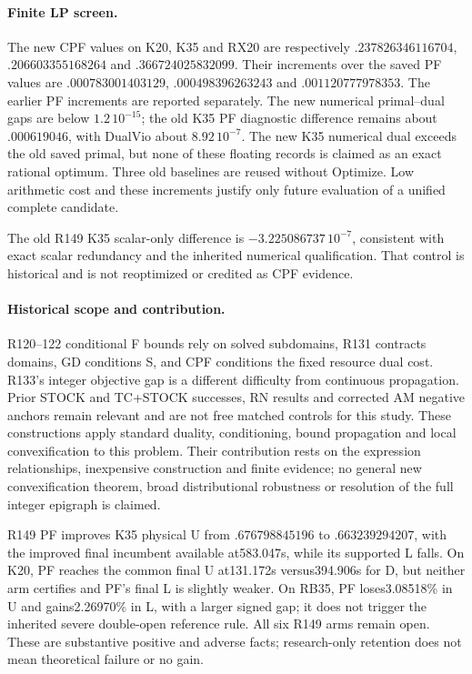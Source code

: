 \paragraph{Finite LP screen.}
The new CPF values on K20, K35 and RX20 are respectively
$.237826346116704$, $.206603355168264$ and $.366724025832099$.
Their increments over the saved PF values are $.000783001403129$,
$.000498396263243$ and $.001120777978353$. The earlier PF increments are
reported separately. The new numerical primal--dual gaps are below
$1.2\,10^{-15}$; the old K35 PF diagnostic difference remains about
$.000619046$, with DualVio about $8.92\,10^{-7}$. The new K35 numerical
dual exceeds the old saved primal, but none of these floating records is
claimed as an exact rational optimum. Three old baselines are reused without
Optimize. Low arithmetic cost and these increments justify only future
evaluation of a unified complete candidate.

The old R149 K35 scalar-only difference is $-3.225086737\,10^{-7}$,
consistent with exact scalar redundancy and the inherited numerical
qualification. That control is historical and is not reoptimized or credited
as CPF evidence.

\paragraph{Historical scope and contribution.}
R120--122 conditional F bounds rely on solved subdomains, R131 contracts
domains, GD conditions S, and CPF conditions the fixed resource dual cost.
R133's integer objective gap is a different difficulty from continuous
propagation. Prior STOCK and TC+STOCK successes, RN results and corrected AM
negative anchors remain relevant and are not free matched controls for this
study. These constructions apply standard duality, conditioning, bound
propagation and local convexification to this problem. Their contribution
rests on the expression relationships, inexpensive construction and finite
evidence; no general new convexification theorem, broad distributional
robustness or resolution of the full integer epigraph is claimed.

R149 PF improves K35 physical U from $.676798845196$ to $.663239294207$,
with the improved final incumbent available at583.047s, while its supported L
falls. On K20, PF reaches the common final U at131.172s versus394.906s for D,
but neither arm certifies and PF's final L is slightly weaker. On RB35,
PF loses3.08518\% in U and gains2.26970\% in L, with a larger signed gap;
it does not trigger the inherited severe double-open reference rule.
All six R149 arms remain open. These are substantive positive and adverse
facts; research-only retention does not mean theoretical failure or no gain.

